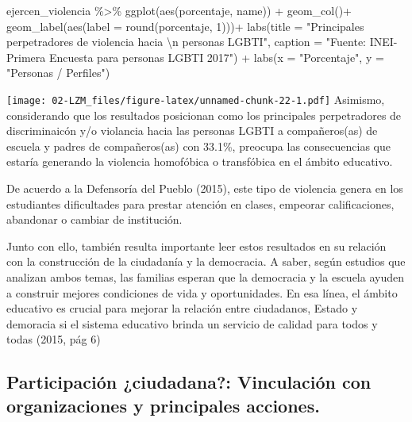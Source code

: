 \documentclass[
]{book}
\newenvironment{Shaded}{\begin{snugshade}}{\end{snugshade}}
\newcommand{\AttributeTok}[1]{\textcolor[rgb]{0.77,0.63,0.00}{#1}}
\newcommand{\DecValTok}[1]{\textcolor[rgb]{0.00,0.00,0.81}{#1}}
\newcommand{\FunctionTok}[1]{\textcolor[rgb]{0.00,0.00,0.00}{#1}}
\newcommand{\NormalTok}[1]{#1}
\newcommand{\SpecialCharTok}[1]{\textcolor[rgb]{0.00,0.00,0.00}{#1}}
\newcommand{\StringTok}[1]{\textcolor[rgb]{0.31,0.60,0.02}{#1}}
\theoremstyle{definition}
\theoremstyle{definition}
\theoremstyle{definition}
\theoremstyle{definition}
\theoremstyle{remark}
\begin{document}
\begin{Shaded}
\begin{Highlighting}[]
\NormalTok{ejercen\_violencia }\SpecialCharTok{\%\textgreater{}\%} 
  \FunctionTok{ggplot}\NormalTok{(}\FunctionTok{aes}\NormalTok{(porcentaje, name)) }\SpecialCharTok{+}
  \FunctionTok{geom\_col}\NormalTok{()}\SpecialCharTok{+}
  \FunctionTok{geom\_label}\NormalTok{(}\FunctionTok{aes}\NormalTok{(}\AttributeTok{label =} \FunctionTok{round}\NormalTok{(porcentaje, }\DecValTok{1}\NormalTok{)))}\SpecialCharTok{+}
    \FunctionTok{labs}\NormalTok{(}\AttributeTok{title =} \StringTok{"Principales perpetradores de violencia hacia }\SpecialCharTok{\textbackslash{}n}\StringTok{ personas LGBTI"}\NormalTok{, }
       \AttributeTok{caption =} \StringTok{"Fuente: INEI{-} Primera Encuesta para personas LGBTI 2017"}\NormalTok{) }\SpecialCharTok{+}
  \FunctionTok{labs}\NormalTok{(}\AttributeTok{x =} \StringTok{"Porcentaje"}\NormalTok{,}
       \AttributeTok{y =} \StringTok{"Personas / Perfiles"}\NormalTok{)}
\end{Highlighting}
\end{Shaded}

\texttt{[image: 02-LZM\_files/figure-latex/unnamed-chunk-22-1.pdf]}
Asimismo, considerando que los resultados posicionan como los principales perpetradores de discriminaicón y/o violancia hacia las personas LGBTI a compañeros(as) de escuela y padres de compañeros(as) con 33.1\%, preocupa las consecuencias que estaría generando la violencia homofóbica o transfóbica en el ámbito educativo.

De acuerdo a la Defensoría del Pueblo (2015), este tipo de violencia genera en los estudiantes dificultades para prestar atención en clases, empeorar calificaciones, abandonar o cambiar de institución.

Junto con ello, también resulta importante leer estos resultados en su relación con la construcción de la ciudadanía y la democracia. A saber, según estudios que analizan ambos temas, las familias esperan que la democracia y la escuela ayuden a construir mejores condiciones de vida y oportunidades. En esa línea, el ámbito educativo es crucial para mejorar la relación entre ciudadanos, Estado y demoracia si el sistema educativo brinda un servicio de calidad para todos y todas (2015, pág 6)

\hypertarget{participaciuxf3n-ciudadana-vinculaciuxf3n-con-organizaciones-y-principales-acciones.}{%
\subsection{Participación ¿ciudadana?: Vinculación con organizaciones y principales acciones.}\label{participaciuxf3n-ciudadana-vinculaciuxf3n-con-organizaciones-y-principales-acciones.}}
\end{document}
